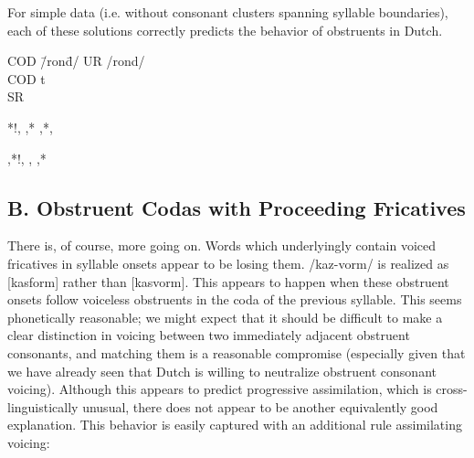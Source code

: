 \documentclass[doc,12pt]{apa6}
\begin{document}
For simple data (i.e. without consonant clusters spanning syllable boundaries),
each of these solutions correctly predicts the behavior of obstruents in
Dutch.

\begin{minipage}{\textwidth}
\begin{exe}
	\ex \begin{tabbing}
		COD \= /ron\=d/ \kill
		UR \> /ron\>d/ \\
		COD \> \>t \\
		SR \>[ront]
		\end{tabbing}
\end{exe}
\end{minipage}

\begin{center}
\begin{OTtableau}{3}
	 {*!, ,*}
	 {  ,*, }
\end{OTtableau}

\begin{OTtableau}{3}
	 { ,*!, }
	 { ,  ,*}
\end{OTtableau}
\end{center}

\noindent

\subsection{B. Obstruent Codas with Proceeding Fricatives}

There is, of course, more going on. Words which underlyingly contain voiced
fricatives in syllable onsets appear to be losing them. /kaz-vorm/ is realized
as [kasform] rather than [kasvorm]. This appears to happen when these obstruent
onsets follow voiceless obstruents in the coda of the previous syllable. This
seems phonetically reasonable; we might expect that it should be difficult to
make a clear distinction in voicing between two immediately adjacent obstruent
consonants, and matching them is a reasonable compromise (especially given that
we have already seen that Dutch is willing to neutralize obstruent consonant
voicing). Although this appears to predict progressive assimilation, which is
cross-linguistically unusual, there does not appear to be another equivalently
good explanation. This behavior is easily captured with an additional rule
assimilating voicing:
\end{document}

